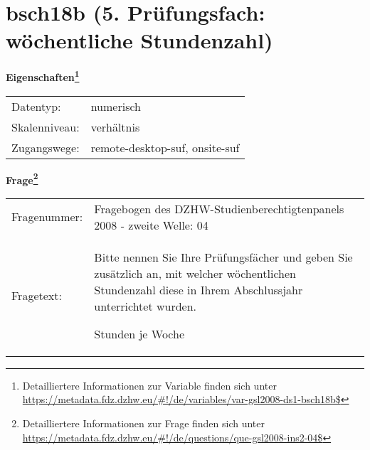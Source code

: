
    \setcounter{footnote}{0}

    \vspace*{-1.8cm}
	\section{bsch18b (5. Prüfungsfach: wöchentliche Stundenzahl)}
	\label{section:bsch18b}



    \vspace*{0.5cm}
    \noindent\textbf{Eigenschaften\footnote{Detailliertere Informationen zur Variable finden sich unter
		\url{https://metadata.fdz.dzhw.eu/\#!/de/variables/var-gsl2008-ds1-bsch18b$}}}\\
	\begin{tabularx}{\hsize}{@{}lX}
	Datentyp: & numerisch \\
	Skalenniveau: & verhältnis \\
	Zugangswege: &
	  remote-desktop-suf, 
	  onsite-suf
 \\
    \end{tabularx}



				\vspace*{0.5cm}
                \noindent\textbf{Frage\footnote{Detailliertere Informationen zur Frage finden sich unter
		              \url{https://metadata.fdz.dzhw.eu/\#!/de/questions/que-gsl2008-ins2-04$}}}\\
				\begin{tabularx}{\hsize}{@{}lX}
					Fragenummer: &
					  Fragebogen des DZHW-Studienberechtigtenpanels 2008 - zweite Welle:
					  04
 \\
					Fragetext: & Bitte nennen Sie Ihre Prüfungsfächer und geben Sie zusätzlich an, mit welcher wöchentlichen Stundenzahl diese in Ihrem Abschlussjahr unterrichtet wurden.\par  Stunden je Woche \\
				\end{tabularx}





